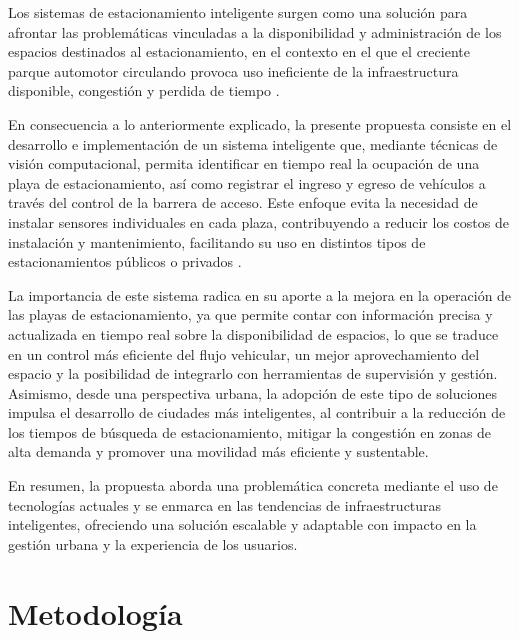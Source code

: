 \documentclass[12pt,a4paper]{article}
\begin{document}
Los sistemas de estacionamiento inteligente surgen como una solución para afrontar las problemáticas vinculadas a la disponibilidad y administración de los espacios destinados al estacionamiento, en el contexto en el que el creciente parque automotor circulando provoca uso ineficiente de la infraestructura disponible, congestión y perdida de tiempo \cite{diaz2020survey, cabri2026reservation, ala2025real}.



En consecuencia a lo anteriormente explicado, la presente propuesta consiste en el desarrollo e implementación de un sistema inteligente que, mediante técnicas de visión computacional, permita identificar en tiempo real la ocupación de una playa de estacionamiento, así como registrar el ingreso y egreso de vehículos a través del control de la barrera de acceso. Este enfoque evita la necesidad de instalar sensores individuales en cada plaza, contribuyendo a reducir los costos de instalación y mantenimiento, facilitando su uso en distintos tipos de estacionamientos públicos o privados \cite{channamallu2025smartparking}.

La importancia de este sistema radica en su aporte a la mejora en la operación de las playas de estacionamiento, ya que permite contar con información precisa y actualizada en tiempo real sobre la disponibilidad de espacios, lo que se traduce en un control más eficiente del flujo vehicular, un mejor aprovechamiento del espacio y la posibilidad de integrarlo con herramientas de supervisión y gestión. Asimismo, desde una perspectiva urbana, la adopción de este tipo de soluciones impulsa el desarrollo de ciudades más inteligentes, al contribuir a la reducción de los tiempos de búsqueda de estacionamiento, mitigar la congestión en zonas de alta demanda y promover una movilidad más eficiente y sustentable.

En resumen, la propuesta aborda una problemática concreta mediante el uso de tecnologías actuales y se enmarca en las tendencias de infraestructuras inteligentes, ofreciendo una solución escalable y adaptable con impacto en la gestión urbana y la experiencia de los usuarios.


\section{Metodología}
\end{document}
